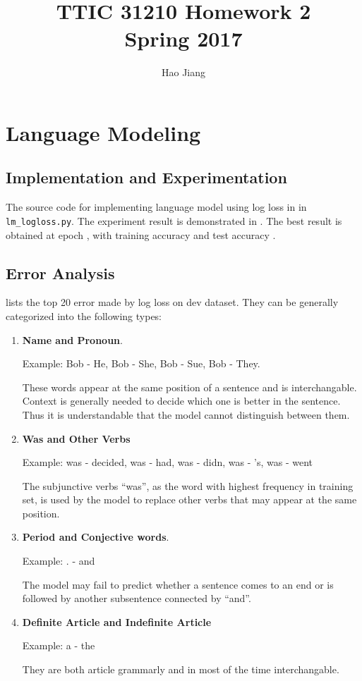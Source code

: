 \documentclass{article}
\title{TTIC 31210 Homework 2 \\ Spring 2017}
\author{Hao Jiang}
\begin{document}
\maketitle
\section{Language Modeling}

\subsection{Implementation and Experimentation}
The source code for implementing language model using log loss in in \texttt{lm\_logloss.py}. The experiment result is demonstrated in . The best result is obtained at epoch , with training accuracy and test accuracy .

\subsection{Error Analysis}
 lists the top 20 error made by log loss on dev dataset. They can be generally categorized into the following types:
\begin{enumerate}
	\item \textbf{Name and Pronoun}. 

Example: Bob - He, Bob - She, Bob - Sue, Bob - They. 

These words appear at the same position of a sentence and is interchangable. Context is generally needed to decide which one is better in the sentence. Thus it is understandable that the model cannot distinguish between them.
	\item \textbf{Was and Other Verbs}

Example: was - decided, was - had, was - didn, was - 's, was - went

The subjunctive verbs ``was'', as the word with highest frequency in training set, is used by the model to replace other verbs that may appear at the same position.
	\item \textbf{Period and Conjective words}.

Example: . - and 

The model may fail to predict whether a sentence comes to an end or is followed by another subsentence connected by ``and''.

	\item \textbf{Definite Article and Indefinite Article} 

Example: a - the

They are both article grammarly and in most of the time interchangable. 

\end{enumerate}
\end{document}
